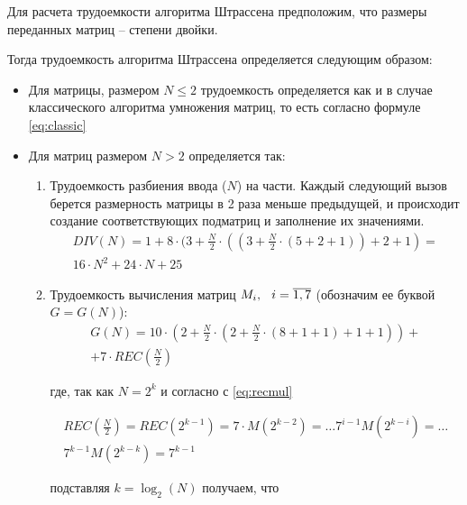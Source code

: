 Для расчета трудоемкости алгоритма Штрассена предположим, что размеры переданных матриц -- степени двойки.

Тогда трудоемкость алгоритма Штрассена определяется следующим образом:

\begin{itemize}[label=---]
	\item Для матрицы, размером $N \leq 2$ трудоемкость определяется как и в случае классического алгоритма умножения матриц, то есть согласно формуле \ref{eq:classic}
	\item Для матриц размером $N > 2$ определяется так:
	\begin{enumerate}[label={\arabic*)}]
		\item Трудоемкость разбиения ввода ($N$) на части. Каждый следующий вызов берется размерность матрицы в 2 раза меньше предыдущей, и происходит создание
		соответствующих подматриц и заполнение их значениями.
		\begin{equation}
			\label{eq:div}
			\begin{gathered}
			DIV(N) = 1 + 8 \cdot (3 + \frac{N}{2} \cdot ((3 + \frac{N}{2} \cdot (5 + 2 + 1)) + 2 + 1) = \\ 16 \cdot N^2 + 24 \cdot N + 25
			\end{gathered}
		\end{equation}
		\item Трудоемкость вычисления матриц $M_i, \hspace{0.25cm} i = \overline{1, 7}$ (обозначим ее буквой $G = G(N)$):
		\begin{equation}
			\label{eq:G}
			\begin{gathered}
				G(N) = 10 \cdot (2 + \frac{N}{2} \cdot (2 + \frac{N}{2} \cdot (8 + 1 + 1) + 1 + 1)) + \\
				+ 7 \cdot REC(\frac{N}{2})
			\end{gathered}
		\end{equation}
	
		где, так как $N = 2^k$ и согласно с \ref{eq:recmul}
		
		\begin{equation}
			\begin{gathered}
			REC(\frac{N}{2}) = REC(2^{k-1}) = 7 \cdot M(2^{k-2}) = \ldots 7^{i-1} M(2^{k-i}) = \ldots \\
			7^{k-1} M(2^{k-k}) = 7^{k-1}
			\end{gathered}
		\end{equation}
		
		подставляя $k = \log_2(N)$ получаем, что 
		

\end{enumerate}
\end{itemize}
